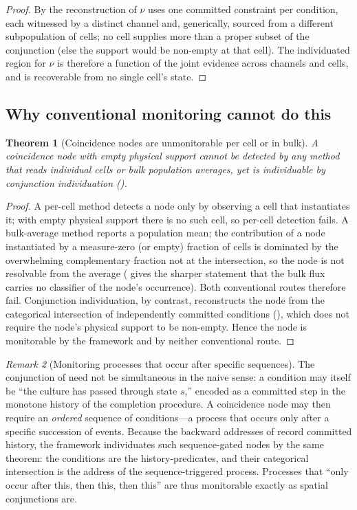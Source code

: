 \documentclass[11pt,twocolumn,a4paper]{article}
\theoremstyle{thmstyle}
\newtheorem{theorem}{Theorem}[section]
\theoremstyle{definition}
\theoremstyle{remark}
\newtheorem{remark}[theorem]{Remark}
\begin{document}
\begin{proof}
By  the reconstruction of $\nu$ uses one committed
constraint per condition, each witnessed by a distinct channel and,
generically, sourced from a different subpopulation of cells; no cell
supplies more than a proper subset of the conjunction (else the support
would be non-empty at that cell). The individuated region for $\nu$ is
therefore a function of the joint evidence across channels and cells, and is
recoverable from no single cell's state.
\end{proof}

\subsection{Why conventional monitoring cannot do this}

\begin{theorem}[Coincidence nodes are unmonitorable per cell or in bulk]
\label{thm:unmonitorable}
A coincidence node with empty physical support cannot be detected by any
method that reads individual cells or bulk population averages, yet is
individuable by conjunction individuation ().
\end{theorem}

\begin{proof}
A per-cell method detects a node only by observing a cell that instantiates
it; with empty physical support there is no such cell, so per-cell detection
fails. A bulk-average method reports a population mean; the contribution of a
node instantiated by a measure-zero (or empty) fraction of cells is
dominated by the overwhelming complementary fraction not at the
intersection, so the node is not resolvable from the average
( gives the sharper statement that the bulk flux carries
no classifier of the node's occurrence). Both conventional routes therefore
fail. Conjunction individuation, by contrast, reconstructs the node from the
categorical intersection of independently committed conditions
(), which does not require the node's physical support
to be non-empty. Hence the node is monitorable by the framework and by
neither conventional route.
\end{proof}

\begin{remark}[Monitoring processes that occur after specific sequences]
\label{rem:sequence}
The conjunction of  need not be simultaneous in the
naive sense: a condition may itself be ``the culture has passed through
state $s$,'' encoded as a committed step in the monotone history of the
completion procedure. A coincidence node may then require an \emph{ordered}
sequence of conditions---a process that occurs only after a specific
succession of events. Because the backward addresses of
 record committed history, the framework individuates
such sequence-gated nodes by the same theorem: the conditions are the
history-predicates, and their categorical intersection is the address of the
sequence-triggered process. Processes that ``only occur after this, then
this, then this'' are thus monitorable exactly as spatial conjunctions are.
\end{remark}
\end{document}
